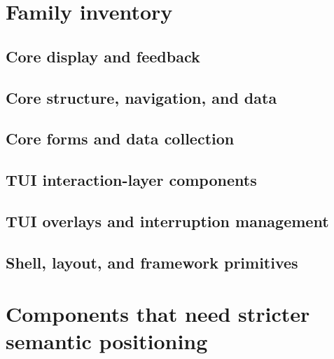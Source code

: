 \section{Family inventory}\label{record-425-family-inventory}

\subsection{Core display and feedback}\label{record-425-core-display-and-feedback}



\subsection{Core structure, navigation, and data}\label{record-425-core-structure-navigation-and-data}



\subsection{Core forms and data collection}\label{record-425-core-forms-and-data-collection}



\subsection{TUI interaction-layer components}\label{record-425-tui-interaction-layer-components}



\subsection{TUI overlays and interruption management}\label{record-425-tui-overlays-and-interruption-management}



\subsection{Shell, layout, and framework primitives}\label{record-425-shell-layout-and-framework-primitives}



\section{Components that need stricter semantic positioning}\label{record-425-components-that-need-stricter-semantic-positioning}

